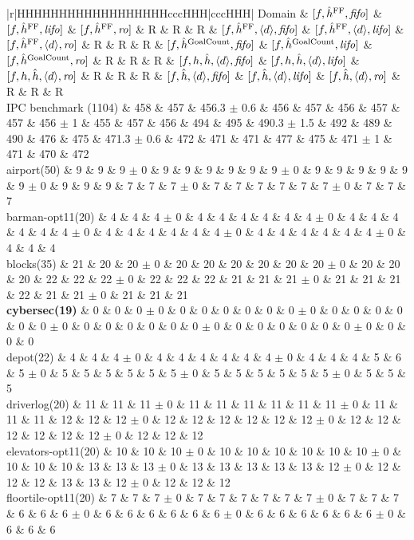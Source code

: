 \begin{center}
\begin{tabular}{|r|HHHHHHHHHHHHHHHHHHcccHHH|cccHHH|}
Domain & $[f,\hat{h}^{\text{FF}},{\text{\textit{fifo}}}]$ & $[f,\hat{h}^{\text{FF}},{\text{\textit{lifo}}}]$ & $[f,\hat{h}^{\text{FF}},{\text{\textit{ro}}}]$ & R & R & R & $[f,\hat{h}^{\text{FF}},{\left<d\right>},{\text{\textit{fifo}}}]$ & $[f,\hat{h}^{\text{FF}},{\left<d\right>},{\text{\textit{lifo}}}]$ & $[f,\hat{h}^{\text{FF}},{\left<d\right>},{\text{\textit{ro}}}]$ & R & R & R & $[f,\hat{h}^{\text{GoalCount}},{\text{\textit{fifo}}}]$ & $[f,\hat{h}^{\text{GoalCount}},{\text{\textit{lifo}}}]$ & $[f,\hat{h}^{\text{GoalCount}},{\text{\textit{ro}}}]$ & R & R & R & $[f,h,\hat{h},{\left<d\right>},{\text{\textit{fifo}}}]$ & $[f,h,\hat{h},{\left<d\right>},{\text{\textit{lifo}}}]$ & $[f,h,\hat{h},{\left<d\right>},{\text{\textit{ro}}}]$ & R & R & R & $[f,\hat{h},{\left<d\right>},{\text{\textit{fifo}}}]$ & $[f,\hat{h},{\left<d\right>},{\text{\textit{lifo}}}]$ & $[f,\hat{h},{\left<d\right>},{\text{\textit{ro}}}]$ & R & R & R\\
\hline
IPC benchmark (1104) & 458 & 457 & 456.3 $\pm$ 0.6 & 456 & 457 & 456 & 457 & 457 & 456 $\pm$ 1 & 455 & 457 & 456 & 494 & 495 & 490.3 $\pm$ 1.5 & 492 & 489 & 490 & 476 & 475 & 471.3 $\pm$ 0.6 & 472 & 471 & 471 & 477 & 475 & 471 $\pm$ 1 & 471 & 470 & 472\\
\hline
airport(50) & 9 & 9 & 9 $\pm$ 0 & 9 & 9 & 9 & 9 & 9 & 9 $\pm$ 0 & 9 & 9 & 9 & 9 & 9 & 9 $\pm$ 0 & 9 & 9 & 9 & 7 & 7 & 7 $\pm$ 0 & 7 & 7 & 7 & 7 & 7 & 7 $\pm$ 0 & 7 & 7 & 7\\
barman-opt11(20) & 4 & 4 & 4 $\pm$ 0 & 4 & 4 & 4 & 4 & 4 & 4 $\pm$ 0 & 4 & 4 & 4 & 4 & 4 & 4 $\pm$ 0 & 4 & 4 & 4 & 4 & 4 & 4 $\pm$ 0 & 4 & 4 & 4 & 4 & 4 & 4 $\pm$ 0 & 4 & 4 & 4\\
blocks(35) & 21 & 20 & 20 $\pm$ 0 & 20 & 20 & 20 & 20 & 20 & 20 $\pm$ 0 & 20 & 20 & 20 & 22 & 22 & 22 $\pm$ 0 & 22 & 22 & 22 & 21 & 21 & 21 $\pm$ 0 & 21 & 21 & 21 & 22 & 21 & 21 $\pm$ 0 & 21 & 21 & 21\\
\textbf{cybersec(19)} & 0 & 0 & 0 $\pm$ 0 & 0 & 0 & 0 & 0 & 0 & 0 $\pm$ 0 & 0 & 0 & 0 & 0 & 0 & 0 $\pm$ 0 & 0 & 0 & 0 & 0 & 0 & 0 $\pm$ 0 & 0 & 0 & 0 & 0 & 0 & 0 $\pm$ 0 & 0 & 0 & 0\\
depot(22) & 4 & 4 & 4 $\pm$ 0 & 4 & 4 & 4 & 4 & 4 & 4 $\pm$ 0 & 4 & 4 & 4 & 5 & 6 & 5 $\pm$ 0 & 5 & 5 & 5 & 5 & 5 & 5 $\pm$ 0 & 5 & 5 & 5 & 5 & 5 & 5 $\pm$ 0 & 5 & 5 & 5\\
driverlog(20) & 11 & 11 & 11 $\pm$ 0 & 11 & 11 & 11 & 11 & 11 & 11 $\pm$ 0 & 11 & 11 & 11 & 12 & 12 & 12 $\pm$ 0 & 12 & 12 & 12 & 12 & 12 & 12 $\pm$ 0 & 12 & 12 & 12 & 12 & 12 & 12 $\pm$ 0 & 12 & 12 & 12\\
elevators-opt11(20) & 10 & 10 & 10 $\pm$ 0 & 10 & 10 & 10 & 10 & 10 & 10 $\pm$ 0 & 10 & 10 & 10 & 13 & 13 & 13 $\pm$ 0 & 13 & 13 & 13 & 13 & 13 & 12 $\pm$ 0 & 12 & 12 & 12 & 13 & 13 & 12 $\pm$ 0 & 12 & 12 & 12\\
floortile-opt11(20) & 7 & 7 & 7 $\pm$ 0 & 7 & 7 & 7 & 7 & 7 & 7 $\pm$ 0 & 7 & 7 & 7 & 6 & 6 & 6 $\pm$ 0 & 6 & 6 & 6 & 6 & 6 & 6 $\pm$ 0 & 6 & 6 & 6 & 6 & 6 & 6 $\pm$ 0 & 6 & 6 & 6\\

\end{tabular}
\end{center}
